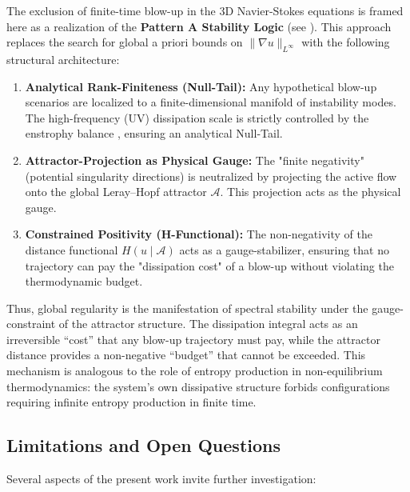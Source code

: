\documentclass[12pt,a4paper]{article}
\theoremstyle{definition}
\theoremstyle{plain}
\theoremstyle{remark}
\begin{document}
The exclusion of finite-time blow-up in the 3D Navier-Stokes equations is framed here as a realization of the \textbf{Pattern A Stability Logic} (see \cite{FST-Unified2026}). This approach replaces the search for global a priori bounds on $\|\nabla u\|_{L^\infty}$ with the following structural architecture:

\begin{enumerate}[label=\alph*)]
    \item \textbf{Analytical Rank-Finiteness (Null-Tail):} Any hypothetical blow-up scenarios are localized to a finite-dimensional manifold of instability modes. The high-frequency (UV) dissipation scale is strictly controlled by the enstrophy balance \cite{Leray1934}, ensuring an analytical Null-Tail.
    \item \textbf{Attractor-Projection as Physical Gauge:} The "finite negativity" (potential singularity directions) is neutralized by projecting the active flow onto the global Leray--Hopf attractor $\mathcal{A}$. This projection acts as the physical gauge.
    \item \textbf{Constrained Positivity (H-Functional):} The non-negativity of the distance functional $H(u \mid \mathcal{A})$ acts as a gauge-stabilizer, ensuring that no trajectory can pay the "dissipation cost" of a blow-up without violating the thermodynamic budget.
\end{enumerate}

Thus, global regularity is the manifestation of spectral stability under the gauge-constraint of the attractor structure.
The dissipation integral acts as an irreversible ``cost'' that any blow-up trajectory must pay, while the attractor distance provides a non-negative ``budget'' that cannot be exceeded. This mechanism is analogous to the role of entropy production in non-equilibrium thermodynamics: the system's own dissipative structure forbids configurations requiring infinite entropy production in finite time.

\subsection{Limitations and Open Questions}

Several aspects of the present work invite further investigation:
\end{document}
